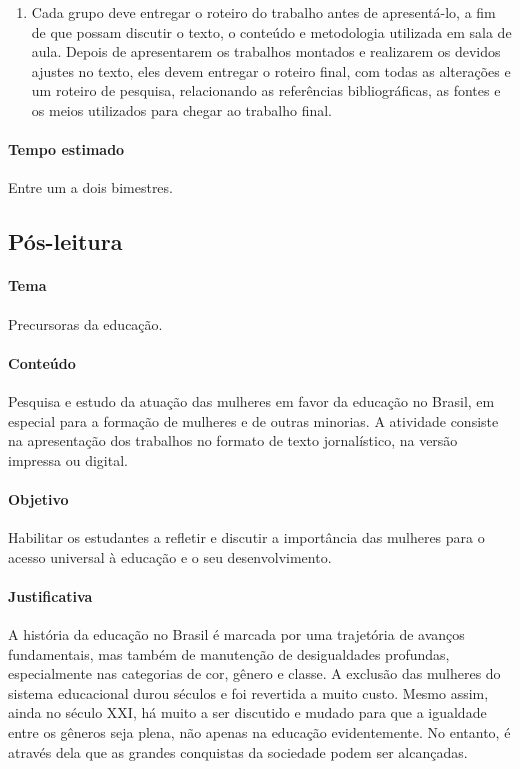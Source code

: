 \documentclass[12pt]{extarticle}
\begin{document}
\begin{enumerate}
\item
Cada grupo deve entregar o roteiro do trabalho antes de apresentá-lo,
a fim de que possam discutir o texto, o conteúdo e metodologia utilizada
em sala de aula. Depois de apresentarem os trabalhos montados e
realizarem os devidos ajustes no texto, eles devem entregar o roteiro
final, com todas as alterações e um roteiro de pesquisa, relacionando as
referências bibliográficas, as fontes e os meios utilizados para chegar
ao trabalho final.
\end{enumerate}

\paragraph{Tempo estimado} Entre um a dois bimestres.



\subsection{Pós-leitura}


\paragraph{Tema} Precursoras da educação.

\paragraph{Conteúdo} Pesquisa e estudo da atuação das mulheres em favor da
educação no Brasil, em especial para a formação de mulheres e de outras
minorias. A atividade consiste na apresentação dos trabalhos no formato
de texto jornalístico, na versão impressa ou digital.

\paragraph{Objetivo} Habilitar os estudantes a refletir e discutir a
importância das mulheres para o acesso universal à educação e o seu
desenvolvimento.

\paragraph{Justificativa} A história da educação no Brasil é marcada por
uma trajetória de avanços fundamentais, mas também de manutenção de
desigualdades profundas, especialmente nas categorias de cor, gênero e
classe. A exclusão das mulheres do sistema educacional durou séculos e
foi revertida a muito custo. Mesmo assim, ainda no século XXI, há muito
a ser discutido e mudado para que a igualdade entre os gêneros seja
plena, não apenas na educação evidentemente. No entanto, é através dela
que as grandes conquistas da sociedade podem ser alcançadas.
\end{document}
